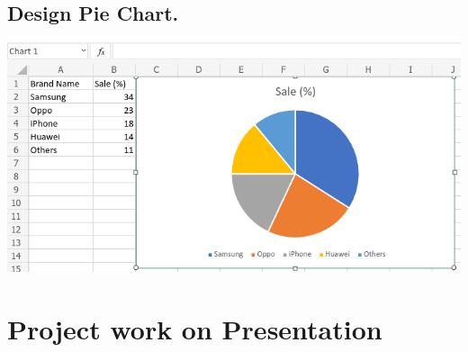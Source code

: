\documentclass[17pt,a4paper,oneside,margin=1in]{article}
\begin{document}
\subsection{Design Pie Chart.}
\includegraphics[width=1\textwidth]{./scrot/spreadsheet-5.png}


\section{Project work on Presentation}
\end{document}
